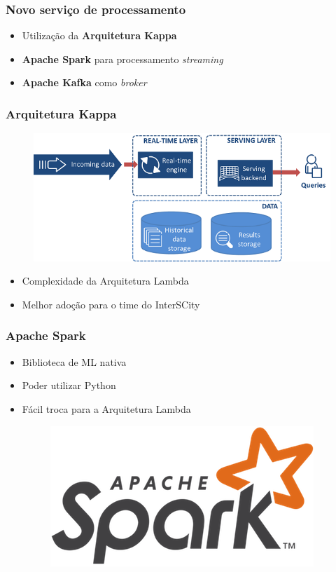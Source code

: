 \documentclass{beamer}
\begin{document}
  \begin{frame}
      \frametitle{Novo serviço de processamento}
      \begin{itemize}
          \item Utilização da \textbf{Arquitetura Kappa}
          \item \textbf{Apache Spark} para processamento \textit{streaming}
          \item \textbf{Apache Kafka} como \textit{broker}
      \end{itemize}
  \end{frame}

  \begin{frame}
      \frametitle{Arquitetura Kappa}
      \begin{figure}
          \includegraphics[scale=0.5]{figures/KappaArchitecture.png}
      \end{figure}
      \begin{itemize}
          \item Complexidade da Arquitetura Lambda
          \item Melhor adoção para o time do InterSCity
      \end{itemize}
  \end{frame}

  \begin{frame}
      \frametitle{Apache Spark}
      \begin{itemize}
          \item Biblioteca de ML nativa
          \item Poder utilizar Python
          \item Fácil troca para a Arquitetura Lambda
              \begin{figure}
                  \includegraphics[scale=0.3]{figures/spark_logo.png}
              \end{figure}
      \end{itemize}
  \end{frame}
\end{document}
